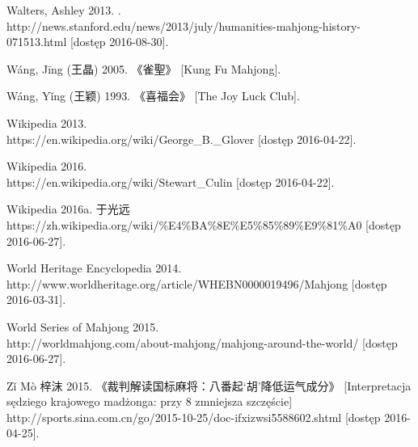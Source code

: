 Walters, Ashley 2013. .
\\http://news.stanford.edu/news/2013/july/humanities-mahjong-history-071513.html
[dostęp 2016-08-30].

Wáng, Jīng (王晶) 2005.  《雀聖》 [Kung Fu Mahjong].

Wáng, Yǐng (王颖) 1993.  《喜福会》 [The Joy Luck Club]. 

Wikipedia 2013. 
\\https://en.wikipedia.org/wiki/George\_B.\_Glover [dostęp 2016-04-22].

Wikipedia 2016. 
\\https://en.wikipedia.org/wiki/Stewart\_Culin [dostęp 2016-04-22].

Wikipedia 2016a.  于光远
\\https://zh.wikipedia.org/wiki/\%E4\%BA\%8E\%E5\%85\%89\%E9\%81\%A0 [dostęp
2016-06-27].


World Heritage Encyclopedia 2014. 
\\http://www.worldheritage.org/article/WHEBN0000019496/Mahjong [dostęp
2016-03-31].

World Series of Mahjong 2015. 
\\http://worldmahjong.com/about-mahjong/mahjong-around-the-world/ [dostęp
2016-06-27].

Zǐ Mò 梓沫 2015. 《裁判解读国标麻将：八番起‘胡’降低运气成分》
[Interpretacja sędziego krajowego madżonga:
 przy 8  zmniejsza szczęście] %
\\http://sports.sina.com.cn/go/2015-10-25/doc-ifxizwsi5588602.shtml [dostęp 2016-04-25].















